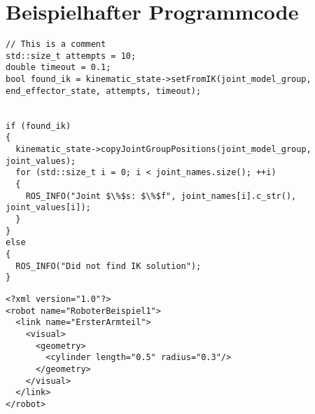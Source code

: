 \newpage
\section{Beispielhafter Programmcode}

\begin{lstlisting}[caption={Ausgabe der Inversen Kinematik}]
// This is a comment
std::size_t attempts = 10;
double timeout = 0.1;
bool found_ik = kinematic_state->setFromIK(joint_model_group, end_effector_state, attempts, timeout);


if (found_ik)
{
  kinematic_state->copyJointGroupPositions(joint_model_group, joint_values);
  for (std::size_t i = 0; i < joint_names.size(); ++i)
  {
    ROS_INFO("Joint $\%$s: $\%$f", joint_names[i].c_str(), joint_values[i]);
  }
}
else
{
  ROS_INFO("Did not find IK solution");
}
\end{lstlisting}

\vspace{0.5cm}

\begin{lstlisting}[caption={Armteil}]
<?xml version="1.0"?>
<robot name="RoboterBeispiel1">
  <link name="ErsterArmteil">
    <visual>
      <geometry>
        <cylinder length="0.5" radius="0.3"/>
      </geometry>
    </visual>
  </link>
</robot>
\end{lstlisting}
\vspace{0.5cm}
